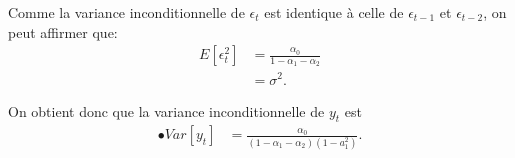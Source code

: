 \begin{solution}{3.1}
Comme la variance inconditionnelle de $\epsilon_t$ est identique à celle de $\epsilon_{t-1}$ et $\epsilon_{t-2}$, on peut affirmer que:
\begin{align*}
E[\epsilon_t^2] &= \frac{\alpha_0}{1-\alpha_1-\alpha_2} \\
&= \sigma^2.
\end{align*}

On obtient donc que la variance inconditionnelle de $y_t$ est
\begin{align*}
•Var[y_t] &= \frac{\alpha_0}{(1-\alpha_1-\alpha_2)(1-a_1^2)}.
\end{align*}
\end{solution}
